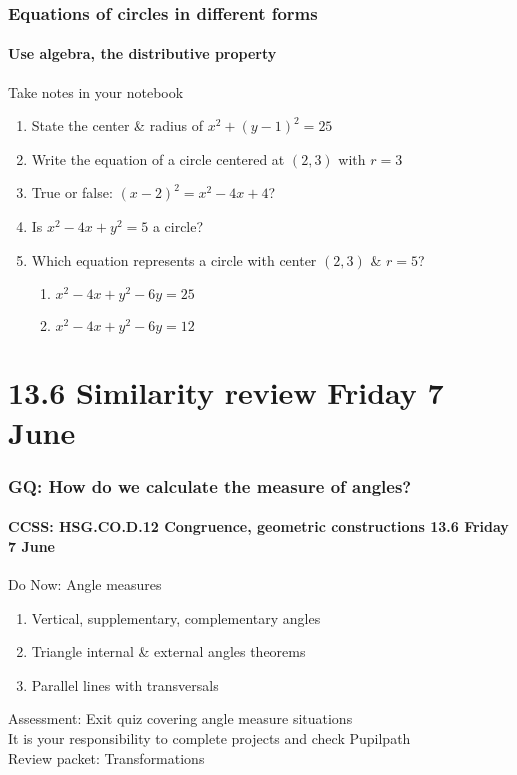 \documentclass{beamer}
\begin{document}
    \frame
    {
      \frametitle{Equations of circles in different forms}
      \framesubtitle{Use algebra, the distributive property}

      \begin{block}{Take notes in your notebook}
        \begin{enumerate}
          \item State the center \& radius of $x^2+(y-1)^2=25$
          \item Write the equation of a circle centered at $(2,3)$ with $r=3$
          \item True or false: $(x-2)^2=x^2-4x+4$?
          \item Is $x^2-4x+y^2 = 5$ a circle?
          \item Which equation represents a circle with center $(2,3)$ \& $r=5$?
          \begin{enumerate}
            \item $x^2-4x+y^2-6y = 25$ \vspace{0.25cm}
            \item $x^2-4x+y^2-6y = 12$
          \end{enumerate}
        \end{enumerate}
      \end{block}
      }

  \section{13.6 Similarity review Friday 7 June}
    \frame
    {
      \frametitle{GQ: How do we calculate the measure of angles?}
      \framesubtitle{CCSS: HSG.CO.D.12 Congruence, geometric constructions \hfill \alert{13.6 Friday 7 June}}

      \begin{block}{Do Now: Angle measures}
        \begin{enumerate}
          \item Vertical, supplementary, complementary angles
          \item Triangle internal \& external angles theorems
          \item Parallel lines with transversals
        \end{enumerate}
      \end{block}
      Assessment: Exit quiz covering angle measure situations\\
      \alert{It is your responsibility to complete projects and check Pupilpath}\\
      Review packet: Transformations
    }
\end{document}
